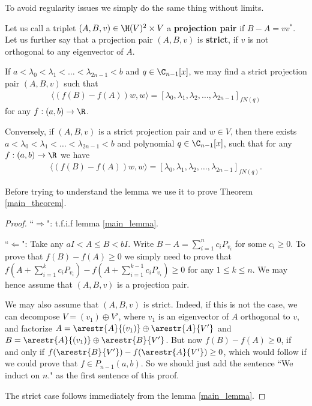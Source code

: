 To avoid regularity issues we simply do the same thing without limits.

\begin{maar}
	Let us call a triplet $(A, B, v) \in \H(V)^{2} \times V$ a \textbf{projection pair} if $B - A = v v^{*}$. Let us further say that a projection pair $(A, B, v)$ is \textbf{strict}, if $v$ is not orthogonal to any eigenvector of $A$. 
\end{maar}

\begin{lem}\label{main_lemma}
	If $a < \lambda_{0} < \lambda_{1} < \ldots < \lambda_{2 n - 1} < b$ and $q \in \C_{n - 1}[x]$, we may find a strict projection pair $(A, B, v)$ such that
	\begin{align*}
		\langle (f(B) - f(A)) w, w \rangle = [\lambda_{0}, \lambda_{1}, \lambda_{2}, \ldots, \lambda_{2 n - 1}]_{f N(q)}
	\end{align*}
	for any $f : (a, b) \to \R$.

	Conversely, if $(A, B, v)$ is a strict projection pair and $w \in V$, then there exists $a < \lambda_{0} < \lambda_{1} < \ldots < \lambda_{2 n - 1} < b$ and polynomial $q \in \C_{n - 1}[x]$, such that for any $f : (a, b) \to \R$ we have
	\begin{align*}
		\langle (f(B) - f(A)) w, w \rangle = [\lambda_{0}, \lambda_{1}, \lambda_{2}, \ldots, \lambda_{2 n - 1}]_{f N(q)}.
	\end{align*}
\end{lem}

Before trying to understand the lemma we use it to prove Theorem \ref{main_theorem}.

\begin{proof}
	``$\Rightarrow$": t.f.i.f lemma \ref{main_lemma}.

	``$\Leftarrow$": Take any $a I < A \leq B < b I$. Write $B - A = \sum_{i = 1}^{n} c_{i} P_{v_{i}}$ for some $c_{i} \geq 0$. To prove that $f(B) - f(A) \geq 0$ we simply need to prove that $f(A + \sum_{i = 1}^{k} c_{i} P_{v_{i}}) - f(A + \sum_{i = 1}^{k - 1} c_{i} P_{v_{i}}) \geq 0$ for any $1 \leq k \leq n$. We may hence assume that $(A, B, v)$ is a projection pair.

	We may also assume that $(A, B, v)$ is strict. Indeed, if this is not the case, we can decompose $V = (v_{1}) \oplus V'$, where $v_{1}$ is an eigenvector of $A$ orthogonal to $v$, and factorize $A = \arestr{A}{(v_{1})} \oplus \arestr{A}{V'}$ and $B = \arestr{A}{(v_{1})} \oplus \arestr{B}{V'}$. But now $f(B) - f(A) \geq 0$, if and only if $f(\arestr{B}{V'}) - f(\arestr{A}{V'}) \geq 0$, which would follow if we could prove that $f \in P_{n - 1}(a, b)$. So we should just add the sentence ``We induct on $n$." as the first sentence of this proof.

	The strict case follows immediately from the lemma \ref{main_lemma}.
\end{proof}

